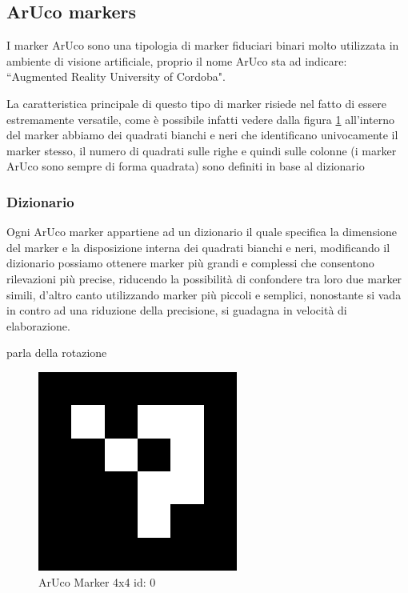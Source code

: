 \documentclass[12pt,a4paper,openright,twoside]{book}
\begin{document}
\subsection{ArUco markers}
I marker ArUco sono una tipologia di marker fiduciari binari molto utilizzata in ambiente di visione artificiale, proprio il nome ArUco sta ad indicare: ``Augmented Reality University of Cordoba".

La caratteristica principale di questo tipo di marker risiede nel fatto di essere estremamente versatile, come è possibile infatti vedere dalla figura \ref{fig:aruco_marker_0}
all'interno del marker abbiamo dei quadrati bianchi e neri che identificano univocamente il marker stesso, il numero di quadrati sulle righe e quindi sulle colonne (i marker ArUco sono sempre di forma quadrata) sono definiti in base al dizionario

\subsubsection{Dizionario}
Ogni ArUco marker appartiene ad un dizionario il quale specifica la dimensione del marker e la disposizione interna dei quadrati bianchi e neri, modificando il dizionario possiamo ottenere marker più grandi e complessi che consentono rilevazioni più precise, riducendo la possibilità di confondere tra loro due marker simili, d'altro canto utilizzando marker più piccoli e semplici, nonostante si vada in contro ad una riduzione della precisione, si guadagna in velocità di elaborazione.

parla della rotazione

\begin{figure}
	\centering
	\includegraphics[width=0.5\linewidth]{./figures/4x4_1000-0.png}
	\caption{ArUco Marker 4x4 id: 0}
	\label{fig:aruco_marker_0}
\end{figure}
\end{document}
